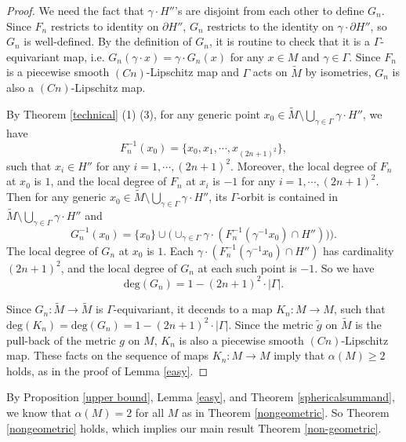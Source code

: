 \documentclass{amsart}
\begin{document}
\begin{proof}

We need the fact that $\gamma\cdot H''$'s are disjoint from each other to define $G_n$. Since $F_n$ restricts to identity on $\partial H''$, $G_n$ restricts to the identity on $\gamma\cdot \partial H''$, so $G_n$ is well-defined. By the definition of $G_n$, it is routine to check that it is a $\Gamma$-equivariant map, i.e. $G_n(\gamma\cdot x)=\gamma\cdot G_n(x)$ for any $x\in M$ and $\gamma\in \Gamma$. Since $F_n$ is a piecewise smooth $(Cn)$-Lipschitz map and $\Gamma$ acts on $\tilde{M}$ by isometries, $G_n$ is also a $(Cn)$-Lipschitz map.

By Theorem \ref{technical} (1) (3), for any generic point $x_0 \in \tilde{M}\setminus \bigcup_{\gamma\in \Gamma}\gamma \cdot H''$, we have 
$$F_n^{-1}(x_0)=\{x_0,x_1,\cdots,  x_{(2n+1)^2}\},$$ 
such that $x_i\in H''$ for any $i=1,\cdots, (2n+1)^2$. Moreover, the local degree of $F_n$ at $x_0$ is $1$, and the local degree of $F_n$ at $x_i$ is $-1$ for any $i=1,\cdots, (2n+1)^2$. Then for any generic $x_0\in \tilde{M}\setminus \bigcup_{\gamma\in \Gamma}\gamma \cdot H''$, its $\Gamma$-orbit is contained in $\tilde{M}\setminus \bigcup_{\gamma\in \Gamma}\gamma \cdot H''$ and
$$G_n^{-1}(x_0)=\{x_0\}\cup \Big(\cup_{\gamma\in \Gamma}\gamma\cdot (F_n^{-1}(\gamma^{-1}x_0)\cap H''))\Big).$$
The local degree of $G_n$ at $x_0$ is $1$. Each $\gamma\cdot (F_n^{-1}(\gamma^{-1}x_0)\cap H'')$ has cardinality $(2n+1)^2$, and the local degree of $G_n$ at each such point is $-1$. So we have 
$$\text{deg}(G_n)=1-(2n+1)^2\cdot |\Gamma|.$$

Since $G_n:\tilde{M} \to \tilde{M}$ is $\Gamma$-equivariant, it decends to a map $K_n:M\to M$, such that $\text{deg}(K_n)=\text{deg}(G_n)=1-(2n+1)^2\cdot |\Gamma|$. Since the metric $\tilde{g}$ on $\tilde{M}$ is the pull-back of the metric $g$ on $M$, $K_n$ is also a piecewise smooth $(Cn)$-Lipschitz map.  These facts on the sequence of maps $K_n: M\to M$ imply that $\alpha(M)\geq 2$ holds, as in the proof of Lemma \ref{easy}.
\end{proof}

By Proposition \ref{upper bound}, Lemma \ref{easy}, and Theorem \ref{sphericalsummand}, we know that $\alpha(M)=2$ for all $M$ as in Theorem \ref{nongeometric}. So Theorem \ref{nongeometric} holds, which implies our main result Theorem \ref{non-geometric}.
\end{document}
